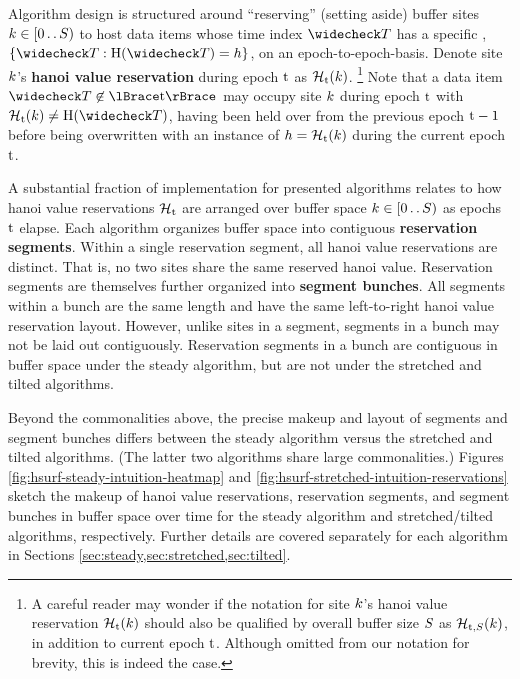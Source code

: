 Algorithm design is structured around ``reserving'' (setting aside) buffer sites $\colork \in [0 \twodots \colorS)$ to host data items whose time index $\colorTbar$ has a specific \hv{}, $\{\colorTbar : \colorH(\colorTbar) = \colorh \}$, on an epoch-to-epoch-basis.
Denote site $\colork$'s \textbf{hanoi value reservation} during epoch $\colort$ as $\colorHcal_{\colort}(\colork)$.%
\footnote{
A careful reader may wonder if the notation for site $\colork$'s hanoi value reservation $\colorHcal_{\colort}(\colork)$ should also be qualified by overall buffer size $\colorS$ as $\colorHcal_{\colort,\colorS}(\colork)$, in addition to current epoch $\colort$.
Although omitted from our notation for brevity, this is indeed the case.
}
Note that a data item $\colorTbar \not\in \colortsetofT$ may occupy site $\colork$ during epoch $\colort$ with $\colorHcal_{\colort}(\colork) \neq \colorH(\colorTbar)$, having been held over from the previous epoch $\colort - 1$ before being overwritten with an instance of \hv{} $\colorh = \colorHcal_{\colort}(\colork)$ during the current epoch $\colort$.

A substantial fraction of implementation for presented algorithms relates to how hanoi value reservations $\colorHcal_{\colort}$ are arranged over buffer space $\colork \in [0\twodots\colorS)$ as epochs $\colort$ elapse.
Each algorithm organizes buffer space into contiguous \textbf{reservation segments}.
Within a single reservation segment, all hanoi value reservations are distinct.
That is, no two sites share the same reserved hanoi value.
Reservation segments are themselves further organized into \textbf{segment bunches}.
All segments within a bunch are the same length and have the same left-to-right hanoi value reservation layout.
However, unlike sites in a segment, segments in a bunch may not be laid out contiguously.
Reservation segments in a bunch are contiguous in buffer space under the steady algorithm, but are not under the stretched and tilted algorithms.

Beyond the commonalities above, the precise makeup and layout of segments and segment bunches differs between the steady algorithm versus the stretched and tilted algorithms.
(The latter two algorithms share large commonalities.)
Figures \ref{fig:hsurf-steady-intuition-heatmap} and \ref{fig:hsurf-stretched-intuition-reservations} sketch the makeup of hanoi value reservations, reservation segments, and segment bunches in buffer space over time for the steady algorithm and stretched/tilted algorithms, respectively.
Further details are covered separately for each algorithm in Sections \cref{sec:steady,sec:stretched,sec:tilted}.

